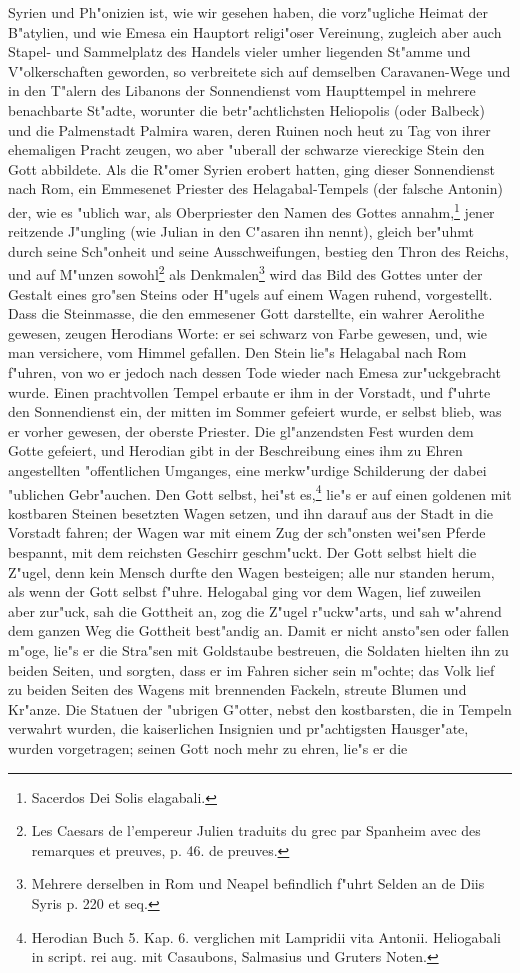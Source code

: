 \documentclass[a4paper, 11pt, oneside, polutonikogreek, german]{article}
\begin{document}
Syrien und Ph"onizien ist, wie wir gesehen haben, die vorz"ugliche Heimat der B"atylien, und wie Emesa ein Hauptort religi"oser Vereinung, zugleich aber auch Stapel- und Sammelplatz des Handels vieler umher liegenden St"amme und V"olkerschaften geworden, so verbreitete sich auf demselben Caravanen-Wege und in den T"alern des Libanons der Sonnendienst vom Haupttempel in mehrere benachbarte St"adte, worunter die betr"achtlichsten Heliopolis (oder Balbeck) und die Palmenstadt Palmira waren, deren Ruinen noch heut zu Tag von ihrer ehemaligen Pracht zeugen, wo aber "uberall der schwarze viereckige Stein den Gott abbildete. Als die R"omer Syrien erobert hatten, ging dieser Sonnendienst nach Rom, ein Emmesenet Priester des Helagabal-Tempels (der falsche Antonin) der, wie es "ublich war, als Oberpriester den Namen des Gottes annahm,\footnote{Sacerdos Dei Solis elagabali.} jener reitzende J"ungling (wie Julian in den C"asaren ihn nennt), gleich ber"uhmt durch seine Sch"onheit und seine Ausschweifungen, bestieg den Thron des Reichs, und auf M"unzen sowohl\footnote{Les Caesars de l'empereur Julien traduits du grec par Spanheim avec des remarques et preuves, p. 46. de preuves.} als Denkmalen\footnote{Mehrere derselben in Rom und Neapel befindlich f"uhrt Selden an de Diis Syris p. 220 et seq.} wird das Bild des Gottes unter der Gestalt eines gro"sen Steins oder H"ugels auf einem Wagen ruhend, vorgestellt. Dass die Steinmasse, die den emmesener Gott darstellte, ein wahrer Aerolithe gewesen, zeugen Herodians Worte: er sei schwarz von Farbe gewesen, und, wie man versichere, vom Himmel gefallen. Den Stein lie"s Helagabal nach Rom f"uhren, von wo er jedoch nach dessen Tode wieder nach Emesa zur"uckgebracht wurde. Einen prachtvollen Tempel erbaute er ihm in der Vorstadt, und f"uhrte den Sonnendienst ein, der mitten im Sommer gefeiert wurde, er selbst blieb, was er vorher gewesen, der oberste Priester. Die gl"anzendsten Fest wurden dem Gotte gefeiert, und Herodian gibt in der Beschreibung eines ihm zu Ehren angestellten "offentlichen Umganges, eine merkw"urdige Schilderung der dabei "ublichen Gebr"auchen. Den Gott selbst, hei"st es,\footnote{Herodian Buch 5. Kap. 6. verglichen mit Lampridii vita Antonii. Heliogabali in script. rei aug. mit Casaubons, Salmasius und Gruters Noten.} lie"s er auf einen goldenen mit kostbaren Steinen besetzten Wagen setzen, und ihn darauf aus der Stadt in die Vorstadt fahren; der Wagen war mit einem Zug der sch"onsten wei"sen Pferde bespannt, mit dem reichsten Geschirr geschm"uckt. Der Gott selbst hielt die Z"ugel, denn kein Mensch durfte den Wagen besteigen; alle nur standen herum, als wenn der Gott selbst f"uhre. Helogabal ging vor dem Wagen, lief zuweilen aber zur"uck, sah die Gottheit an, zog die Z"ugel r"uckw"arts, und sah w"ahrend dem ganzen Weg die Gottheit best"andig an. Damit er nicht ansto"sen oder fallen m"oge, lie"s er die Stra"sen mit Goldstaube bestreuen, die Soldaten hielten ihn zu beiden Seiten, und sorgten, dass er im Fahren sicher sein m"ochte; das Volk lief zu beiden Seiten des Wagens mit brennenden Fackeln, streute Blumen und Kr"anze. Die Statuen der "ubrigen G"otter, nebst den kostbarsten, die in Tempeln verwahrt wurden, die kaiserlichen Insignien und pr"achtigsten Hausger"ate, wurden vorgetragen; seinen Gott noch mehr zu ehren, lie"s er die 
\end{document}
